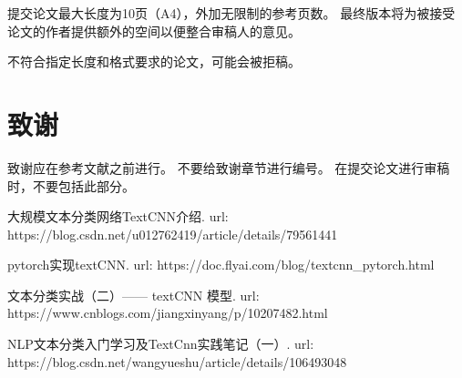 \documentclass[11pt]{article}
\begin{document}
\begin{CJK*}{UTF8}{gbsn}
提交论文最大长度为10页（A4），外加无限制的参考页数。
最终版本将为被接受论文的作者提供额外的空间以便整合审稿人的意见。

不符合指定长度和格式要求的论文，可能会被拒稿。

\section*{致谢}

致谢应在参考文献之前进行。
不要给致谢章节进行编号。
在提交论文进行审稿时，不要包括此部分。

%
%

\begin{thebibliography}{}

\bibitem[\protect\citename{}]{}
大规模文本分类网络TextCNN介绍.
\newblock url: 
\newblock https://blog.csdn.net/u012762419/article/details/79561441
\newblock 

\bibitem[\protect\citename{}]{}
pytorch实现textCNN.
\newblock url: 
\newblock https://doc.flyai.com/blog/textcnn\_pytorch.html
\newblock 

\bibitem[\protect\citename{}]{}
文本分类实战（二）—— textCNN 模型.
\newblock url:  
\newblock https://www.cnblogs.com/jiangxinyang/p/10207482.html
\newblock 

\bibitem[\protect\citename{}]{}
NLP文本分类入门学习及TextCnn实践笔记（一）.
\newblock url:  
\newblock https://blog.csdn.net/wangyueshu/article/details/106493048
\newblock 


\end{thebibliography}

\end{CJK*}
\end{document}
